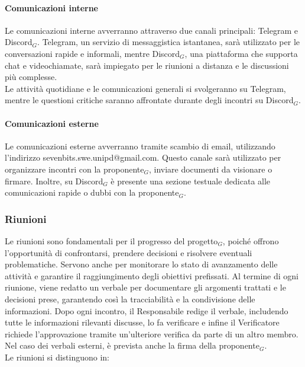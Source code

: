 \documentclass[10pt]{article}
\begin{document}
\begin{justify}
        \paragraph{Comunicazioni interne}
        Le comunicazioni interne avverranno attraverso due canali principali: Telegram e Discord$_G$. Telegram, un servizio di messaggistica istantanea, sarà utilizzato per le conversazioni rapide e informali, mentre Discord$_G$, una piattaforma che supporta chat e videochiamate, sarà impiegato per le riunioni a distanza e le discussioni più complesse.\\
        Le attività quotidiane e le comunicazioni generali si svolgeranno su Telegram, mentre le questioni critiche saranno affrontate durante degli incontri su Discord$_G$.

        \paragraph{Comunicazioni esterne}
        Le comunicazioni esterne avverranno tramite scambio di email, utilizzando l'indirizzo sevenbits.swe.unipd@gmail.com. Questo canale sarà utilizzato per organizzare incontri con la proponente$_G$, inviare documenti da visionare o firmare. Inoltre, su Discord$_G$ è presente una sezione testuale dedicata alle comunicazioni rapide o dubbi con la proponente$_G$.

    \subsubsection{Riunioni}
    Le riunioni sono fondamentali per il progresso del progetto$_G$, poiché offrono l'opportunità di confrontarsi, prendere decisioni e risolvere eventuali problematiche. Servono anche per monitorare lo stato di avanzamento delle attività e garantire il raggiungimento degli obiettivi prefissati.
    Al termine di ogni riunione, viene redatto un verbale per documentare gli argomenti trattati e le decisioni prese, garantendo così la tracciabilità e la condivisione delle informazioni. Dopo ogni incontro, il Responsabile redige il verbale, includendo tutte le informazioni rilevanti discusse, lo fa verificare e infine il Verificatore richiede l'approvazione tramite un'ulteriore verifica da parte di un altro membro. Nel caso dei verbali esterni, è prevista anche la firma della proponente$_G$.\\
    Le riunioni si distinguono in:


\end{justify}
\end{document}
